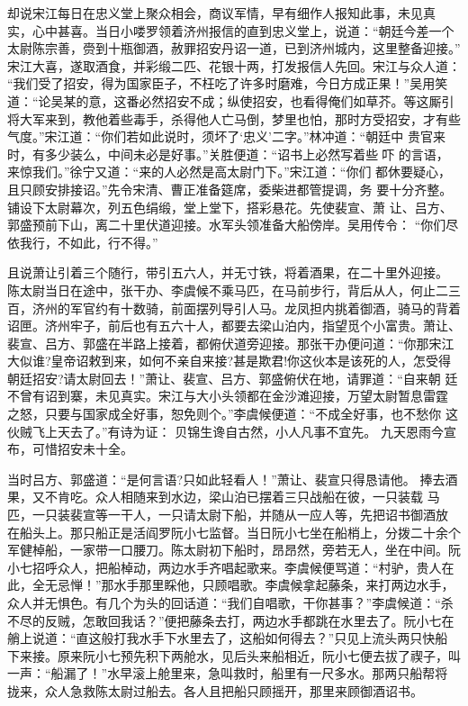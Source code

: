 却说宋江每日在忠义堂上聚众相会，商议军情，早有细作人报知此事，未见真
实，心中甚喜。当日小喽罗领着济州报信的直到忠义堂上，说道：“朝廷今差一个
太尉陈宗善，赍到十瓶御酒，赦罪招安丹诏一道，已到济州城内，这里整备迎接。”
宋江大喜，遂取酒食，并彩缎二匹、花银十两，打发报信人先回。宋江与众人道：
“我们受了招安，得为国家臣子，不枉吃了许多时磨难，今日方成正果！”吴用笑
道：“论吴某的意，这番必然招安不成；纵使招安，也看得俺们如草芥。等这厮引
将大军来到，教他着些毒手，杀得他人亡马倒，梦里也怕，那时方受招安，才有些
气度。”宋江道：“你们若如此说时，须坏了‘忠义’二字。”林冲道：“朝廷中
贵官来时，有多少装么，中间未必是好事。”关胜便道：“诏书上必然写着些吓
的言语，来惊我们。”徐宁又道：“来的人必然是高太尉门下。”宋江道：“你们
都休要疑心，且只顾安排接诏。”先令宋清、曹正准备筵席，委柴进都管提调，务
要十分齐整。铺设下太尉幕次，列五色绢缎，堂上堂下，搭彩悬花。先使裴宣、萧
让、吕方、郭盛预前下山，离二十里伏道迎接。水军头领准备大船傍岸。吴用传令：
“你们尽依我行，不如此，行不得。”

且说萧让引着三个随行，带引五六人，并无寸铁，将着酒果，在二十里外迎接。
陈太尉当日在途中，张干办、李虞候不乘马匹，在马前步行，背后从人，何止二三
百，济州的军官约有十数骑，前面摆列导引人马。龙凤担内挑着御酒，骑马的背着
诏匣。济州牢子，前后也有五六十人，都要去梁山泊内，指望觅个小富贵。萧让、
裴宣、吕方、郭盛在半路上接着，都俯伏道旁迎接。那张干办便问道：“你那宋江
大似谁?皇帝诏敕到来，如何不亲自来接?甚是欺君!你这伙本是该死的人，怎受得
朝廷招安?请太尉回去！”萧让、裴宣、吕方、郭盛俯伏在地，请罪道：“自来朝
廷不曾有诏到寨，未见真实。宋江与大小头领都在金沙滩迎接，万望太尉暂息雷霆
之怒，只要与国家成全好事，恕免则个。”李虞候便道：“不成全好事，也不愁你
这伙贼飞上天去了。”有诗为证：
贝锦生谗自古然，小人凡事不宜先。
九天恩雨今宣布，可惜招安未十全。

当时吕方、郭盛道：“是何言语?只如此轻看人！”萧让、裴宣只得恳请他。
捧去酒果，又不肯吃。众人相随来到水边，梁山泊已摆着三只战船在彼，一只装载
马匹，一只装裴宣等一干人，一只请太尉下船，并随从一应人等，先把诏书御酒放
在船头上。那只船正是活阎罗阮小七监督。当日阮小七坐在船梢上，分拨二十余个
军健棹船，一家带一口腰刀。陈太尉初下船时，昂昂然，旁若无人，坐在中间。阮
小七招呼众人，把船棹动，两边水手齐唱起歌来。李虞候便骂道：“村驴，贵人在
此，全无忌惮！”那水手那里睬他，只顾唱歌。李虞候拿起藤条，来打两边水手，
众人并无惧色。有几个为头的回话道：“我们自唱歌，干你甚事？”李虞候道：“杀
不尽的反贼，怎敢回我话？”便把藤条去打，两边水手都跳在水里去了。阮小七在
艄上说道：“直这般打我水手下水里去了，这船如何得去？”只见上流头两只快船
下来接。原来阮小七预先积下两舱水，见后头来船相近，阮小七便去拔了禊子，叫
一声：“船漏了！”水早滚上舱里来，急叫救时，船里有一尺多水。那两只船帮将
拢来，众人急救陈太尉过船去。各人且把船只顾摇开，那里来顾御酒诏书。

